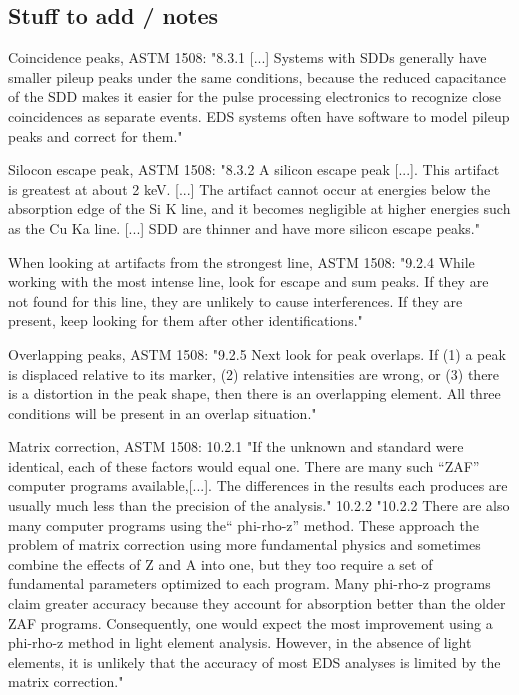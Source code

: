 \subsection{Stuff to add / notes}




Coincidence peaks, ASTM 1508:
"8.3.1 [...] Systems with SDDs generally have smaller pileup
peaks under the same conditions, because the reduced capacitance
of the SDD makes it easier for the pulse processing
electronics to recognize close coincidences as separate events.
EDS systems often have software to model pileup peaks and
correct for them."


Silocon escape peak, ASTM 1508:
"8.3.2 A silicon escape peak [...].
This artifact is greatest at about 2 keV. [...]
The artifact cannot occur at energies
below the absorption edge of the Si K line, and it becomes
negligible at higher energies such as the Cu Ka line. [...]
SDD are thinner and have more silicon escape peaks."


When looking at artifacts from the strongest line, ASTM 1508:
"9.2.4 While working with the most intense line, look for
escape and sum peaks. If they are not found for this line, they
are unlikely to cause interferences. If they are present, keep
looking for them after other identifications."


Overlapping peaks, ASTM 1508:
"9.2.5 Next look for peak overlaps. If (1) a peak is displaced
relative to its marker, (2) relative intensities are wrong, or (3)
there is a distortion in the peak shape, then there is an
overlapping element. All three conditions will be present in an
overlap situation."


Matrix correction, ASTM 1508:
10.2.1 "If the unknown and standard were
identical, each of these factors would equal one. There are
many such “ZAF” computer programs available,[...].
The differences in the results each produces are usually
much less than the precision of the analysis."
10.2.2 "10.2.2 There are also many computer programs using the“
phi-rho-z” method.  These approach the problem of matrix
correction using more fundamental physics and sometimes
combine the effects of Z and A into one, but they too require a
set of fundamental parameters optimized to each program.
Many phi-rho-z programs claim greater accuracy because they
account for absorption better than the older ZAF programs.
Consequently, one would expect the most improvement using
a phi-rho-z method in light element analysis. However, in the
absence of light elements, it is unlikely that the accuracy of
most EDS analyses is limited by the matrix correction."



